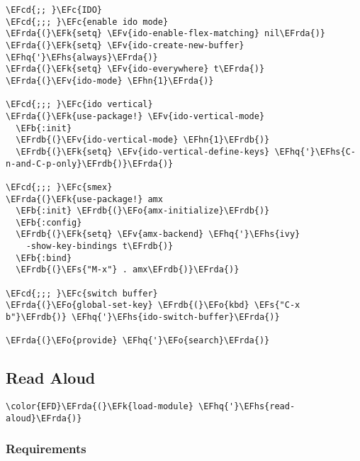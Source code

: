\documentclass[a4wide,10pt]{article}
\newcommand{\EFc}[1]{\textcolor{EFc}{#1}} %
\newcommand{\EFcd}[1]{\textcolor{EFcd}{#1}} %
\newcommand{\EFs}[1]{\textcolor{EFs}{#1}} %
\newcommand{\EFk}[1]{\textcolor{EFk}{#1}} %
\newcommand{\EFb}[1]{\textcolor{EFb}{#1}} %
\newcommand{\EFv}[1]{\textcolor{EFv}{#1}} %
\newcommand{\EFo}[1]{\textcolor{EFo}{#1}} %
\newcommand{\EFhn}[1]{\textcolor{EFhn}{\textbf{#1}}} %
\newcommand{\EFhq}[1]{\textcolor{EFhq}{#1}} %
\newcommand{\EFhs}[1]{\textcolor{EFhs}{#1}} %
\newcommand{\EFrda}[1]{\textcolor{EFrda}{#1}} %
\newcommand{\EFrdb}[1]{\textcolor{EFrdb}{#1}} %
\begin{document}
\begin{Code}
\begin{Verbatim}
\EFcd{;; }\EFc{IDO}
\EFcd{;;; }\EFc{enable ido mode}
\EFrda{(}\EFk{setq} \EFv{ido-enable-flex-matching} nil\EFrda{)}
\EFrda{(}\EFk{setq} \EFv{ido-create-new-buffer} \EFhq{'}\EFhs{always}\EFrda{)}
\EFrda{(}\EFk{setq} \EFv{ido-everywhere} t\EFrda{)}
\EFrda{(}\EFv{ido-mode} \EFhn{1}\EFrda{)}

\EFcd{;;; }\EFc{ido vertical}
\EFrda{(}\EFk{use-package!} \EFv{ido-vertical-mode}
  \EFb{:init}
  \EFrdb{(}\EFv{ido-vertical-mode} \EFhn{1}\EFrdb{)}
  \EFrdb{(}\EFk{setq} \EFv{ido-vertical-define-keys} \EFhq{'}\EFhs{C-n-and-C-p-only}\EFrdb{)}\EFrda{)}

\EFcd{;;; }\EFc{smex}
\EFrda{(}\EFk{use-package!} amx
  \EFb{:init} \EFrdb{(}\EFo{amx-initialize}\EFrdb{)}
  \EFb{:config}
  \EFrdb{(}\EFk{setq} \EFv{amx-backend} \EFhq{'}\EFhs{ivy}
	-show-key-bindings t\EFrdb{)}
  \EFb{:bind}
  \EFrdb{(}\EFs{"M-x"} . amx\EFrdb{)}\EFrda{)}

\EFcd{;;; }\EFc{switch buffer}
\EFrda{(}\EFo{global-set-key} \EFrdb{(}\EFo{kbd} \EFs{"C-x b"}\EFrdb{)} \EFhq{'}\EFhs{ido-switch-buffer}\EFrda{)}

\EFrda{(}\EFo{provide} \EFhq{'}\EFo{search}\EFrda{)}
\end{Verbatim}
\end{Code}
\subsection{Read Aloud}
\label{sec:org36a385c}
\begin{Code}
\begin{Verbatim}
\color{EFD}\EFrda{(}\EFk{load-module} \EFhq{'}\EFhs{read-aloud}\EFrda{)}
\end{Verbatim}
\end{Code}
\subsubsection{Requirements}
\label{sec:org3e1fc97}
\end{document}

